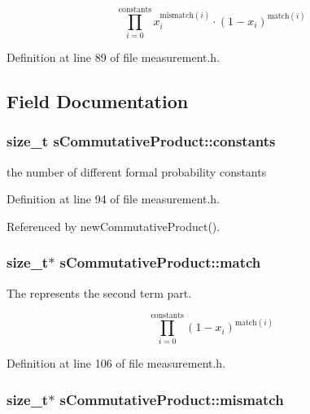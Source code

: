 \[ \prod_{i=0}^{\mathrm{constants}} x_i^{\mathrm{mismatch}(i)} \cdot (1-x_i)^{\mathrm{match}(i)} \] 

\-Definition at line 89 of file measurement.\-h.



\subsection{\-Field \-Documentation}
\hypertarget{structsCommutativeProduct_af77351b19630473b2fedc9267665032a}{
\subsubsection[{constants}]{\setlength{\rightskip}{0pt plus 5cm}size\-\_\-t {\bf s\-Commutative\-Product\-::constants}}}\label{structsCommutativeProduct_af77351b19630473b2fedc9267665032a}


the number of different formal probability constants 



\-Definition at line 94 of file measurement.\-h.



\-Referenced by new\-Commutative\-Product().

\hypertarget{structsCommutativeProduct_ae78261dbaf0a6455774a84836fe7334d}{
\subsubsection[{match}]{\setlength{\rightskip}{0pt plus 5cm}size\-\_\-t$\ast$ {\bf s\-Commutative\-Product\-::match}}}\label{structsCommutativeProduct_ae78261dbaf0a6455774a84836fe7334d}


\-The represents the second term part. 

\[ \prod_{i=0}^{\mathrm{constants}} (1-x_i)^{\mathrm{match}(i)} \] 

\-Definition at line 106 of file measurement.\-h.

\hypertarget{structsCommutativeProduct_a95aa7c0ea80854b88afc16d913137f35}{
\subsubsection[{mismatch}]{\setlength{\rightskip}{0pt plus 5cm}size\-\_\-t$\ast$ {\bf s\-Commutative\-Product\-::mismatch}}}\label{structsCommutativeProduct_a95aa7c0ea80854b88afc16d913137f35}


